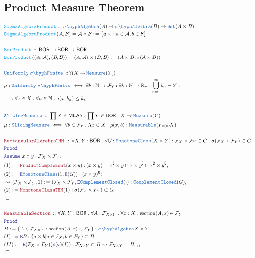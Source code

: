 \documentclass[12pt]{scrartcl}
\newcommand{\TYPE}[1]{\textcolor{NavyBlue}{\mathtt{#1}}}
\newcommand{\FUNC}[1]{\textcolor{Cerulean}{\mathtt{#1}}}
\newcommand{\LOGIC}[1]{\textcolor{Blue}{\mathtt{#1}}}
\newcommand{\THM}[1]{\textcolor{Maroon}{\mathtt{#1}}}
\renewcommand{\.}{\; . \;}
\newcommand{\de}{: \kern 0.1pc =}
\newcommand{\Act}[1]{\left( #1 \right)}
\newcommand{\Theorem}[2]{& \THM{#1} \, :: \, #2 \\ & \Proof = \\ }
\newcommand{\DeclareType}[2]{& \TYPE{#1} \, :: \, #2 \\}
\newcommand{\DefineType}[3]{& #1 : \TYPE{#2} \iff #3 \\}
\newcommand{\DeclareFunc}[2]{& \FUNC{#1} \, :: \, #2 \\}
\newcommand{\DefineNamedFunc}[4]{&  \FUNC{#1}\Act{#2} = #3 \de #4 \\}
\newcommand{\NewLine}{\\ & \kern 1pc}
\newcommand{\Page}[1]{ \begin{align*} #1 \end{align*}   }
\newcommand{\ForEach}[3]{\forall #1 : #2 \. #3 }
\newcommand{\Reals}{\mathbb{R} }
\newcommand{\Nat}{\mathbb{N} }
\newcommand{\Set}{\TYPE{Set}}
\renewcommand{\c}{\complement}
\newcommand{\Say}[3]{& #1 \de #2 : #3, \\}
\newcommand{\Conclude}[3]{& #1 \de #2 : #3; \\}
\newcommand{\Derive}[3]{& \leadsto #1 \de #2 : #3, \\}
\newcommand{\Assume}[2]{& \LOGIC{Assume} \; #1 : #2, \\}
\newcommand{\ByDef}{\LOGIC{E}}
\newcommand{\QED}{\; \square}
\newcommand{\EndProof}{& \QED \\}
\newcommand{\Proof}{\LOGIC{Proof} \; }
\newcommand{\SA}{\TYPE{\sigma \hyph Algebra}}
\newcommand{\B}{\mathcal{B}}
\newcommand{\BOR}{\mathsf{BOR}}
\newcommand{\F}{\mathcal{F}}
\begin{document}
\subsection{Product Measure Theorem }
\Page{
\DeclareFunc{SigmaAlgebraProduct}{\SA(A) \to \SA(B) \to \Set(A \times B)}
\DefineNamedFunc{SigmaAlgebraProduct}{\mathcal{A},\B}{\mathcal{A} \times \B}
{\{ a \times b | a \in \mathcal{A}, b \in \mathcal{B} \}}
\\
\DeclareFunc{BorProduct}{\mathsf{BOR} \to \mathsf{BOR} \to \mathsf{BOR}}
\DefineNamedFunc{BorProduct}{(A,\mathcal{A}),(B,\B)}{(A,\mathcal{A}) \times (B,\B)}
{(A \times B, \sigma(\mathcal{A} \times B))}
\\
\DeclareType{Uniformly \; \sigma \hyph Finite}{ ?(
X \to \TYPE{Measure}(Y) ) }
\DefineType{\mu}{Uniformly \; \sigma \hyph Finite}
{ \exists b : \Nat \to \F_Y : \exists k : \Nat \to \Reals_+ : \bigcup^\infty_{n = 1} b_n = 
Y : \NewLine
 :
\forall x \in X \. \forall n \in \Nat \. \mu(x,b_n) \le k_n }
\\
\DeclareType{SlicingMeasure}{\prod X \in \mathsf{MEAS} \. 
\prod Y \in \BOR \.
X \to \TYPE{Measure}(Y) }
\DefineType{\mu}{SlicingMeasure}
 {\forall b \in \F_Y \. \Lambda x \in X \. \mu(x,b) : \TYPE{Measurable}(F_{\BOR}X)}
 \\
 \Theorem{RectangularAlgrebraTHM}{
 \ForEach{ X, Y}{ \BOR }{ 
 \ForEach{ G}{ \TYPE{MonotoneClass}(X \times Y) : \F_X \times \F_Y \subset G}{  \sigma(\F_X \times \F_Y) \subset G} 
 }}
 \Assume{x \times y}{\F_X \times \F_Y }
 \Say{(1)}{\THM{ProductComplement}(x \times y)}{ (x \times y) = x^\c \times y \cap x \times y^\c \cap x^\c \times y^\c }
 \Conclude{(2)}{\ByDef\TYPE{MonotoneClass}(1,\ByDef(G))}{ (x \times y)^\c }
 \Derive{(\F_X \times \F_Y, 1)}{(\F_X \times \F_Y,\ByDef \TYPE{ComplementClosed}(\cdot)}{\TYPE{ComplementClosed}(G)}
 \Conclude{ (2) }{\THM{MonotoneClassTHM}(1)}{\sigma(\F_X \times F_Y) \subset G}
 \EndProof
 \\ 
 \Theorem{MeasurableSection}{
 \ForEach{ X,Y}{\BOR}{ 
 \ForEach{A}{\F_{X \times Y  }}{ 
 \ForEach{x}{X}{  \mathrm{section}(A,x) \in \F_Y}  
 }}}
 \Say{B}{\{ A \in \F_{X \times Y} : \mathrm{section}(A,x) \in \F_Y \}}{\SA{X \times Y}}
 \Say{(I)}{\ByDef{B}}{ \{ a \times b | a \in F_X , b \in F_Y \}
   \subset  B}
 \Conclude{(II)}{\ByDef(\F_X \times F_Y)(\ByDef(\sigma)(I))}{\F_{X \times Y} \subset B  \leadsto
  \F_{X \times Y} = B ;; 
 }
 \EndProof
}
 \newpage
\end{document}
